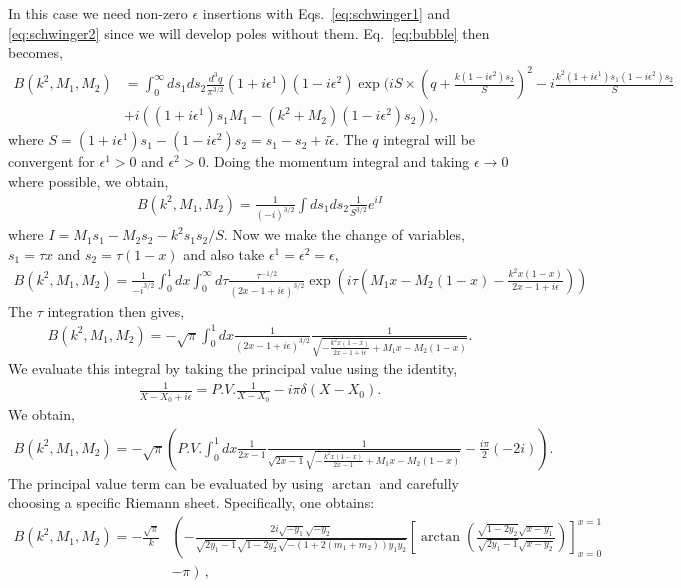 \documentclass[twoside]{article}
\begin{document}
In this case we need non-zero $\epsilon$ insertions with Eqs.~\eqref{eq:schwinger1} and \eqref{eq:schwinger2} since we will develop poles without them. Eq.~\eqref{eq:bubble} then becomes,
\begin{align}
 B(k^2, M_1, M_2) &= \int_0^\infty ds_1 ds_2\frac{d^3q}{\pi^{3/2}}(1 + i\epsilon^1)(1 - i\epsilon^2)\exp\Big( i S \times \left( q + \frac{k(1 - i\epsilon^2)s_2}{S} \right)^2 - i\frac{k^2(1+i\epsilon^1) s_1 (1-i\epsilon^2) s_2}{S} \nonumber \\
&+ i\left( (1 + i\epsilon^1)s_1 M_1 - (k^2 + M_2)(1 - i\epsilon^2)s_2 \right) \Big),
\end{align}
where $S = (1 + i\epsilon^1)s_1 - (1-i\epsilon^2)s_2 = s_1 - s_2 + i \tilde{\epsilon}$. The $q$ integral will be convergent for $\epsilon^1 > 0$ and $\epsilon^2 > 0$. Doing the momentum integral and taking $\epsilon \rightarrow 0$ where possible, we obtain,
\begin{align}
  B(k^2, M_1,M_2) = \frac{1}{(-i)^{3/2}}\int ds_1ds_2\frac{1}{S^{3/2}}e^{iI}
\end{align}
where $I = M_1 s_1 - M_2 s_2 - k^2 s_1s_2/S$. Now we make the
change of variables, $s_1 = \tau x$ and $s_2 = \tau(1-x)$ and also take $\epsilon^1 = \epsilon^2 = \epsilon$,
\begin{align}
  B(k^2,M_1,M_2) = \frac{1}{-i^{3/2}}\int^1_0dx\int^{\infty}_0d\tau \frac{\tau^{-1/2}}{(2x-1 + i\epsilon)^{3/2}}\exp\left( i\tau\left(
      M_1 x - M_2(1-x) - \frac{k^2x(1-x)}{2x-1 + i\epsilon}
  \right)\right)
\end{align}
The $\tau$ integration then gives,
\begin{align}
 B(k^2,M_1,M_2) =   -\sqrt{\pi}\int^1_0dx \frac{1}{(2x - 1 + i\epsilon)^{3/2}}\frac{1}{\sqrt{-\frac{k^2x(1-x)}{2x-1+ i\epsilon} + M_1x - M_2(1-x)}}.
\end{align}
We evaluate this integral by taking the principal value using the identity,
\begin{align}
  \frac{1}{X - X_0+ i\epsilon} = P.V.\frac{1}{X-X_0} - i\pi \delta  (X- X_0) .
\end{align}
We obtain,
\begin{align}
\label{eq:PVintegral}
 B(k^2,M_1,M_2) = -\sqrt{\pi}\left(P.V. \int^1_0dx \frac{1}{2x - 1}\frac{1}{\sqrt{2x - 1}\sqrt{-\frac{k^2x(1-x)}{2x-1} + M_1x - M_2(1-x)}} -\frac{i \pi}{2} (-2 i) \right).
\end{align}
The principal value term can be evaluated by using $\arctan$ and carefully choosing a specific Riemann sheet.
Specifically, one obtains:
\begin{equation}
\begin{split}
B(k^2, M_1, M_2) = -\frac{\sqrt{\pi}}{k}&\left(-\frac{2 i \sqrt{- y_1} \sqrt{- y_2}}{\sqrt{2 y_1-1} \sqrt{1- 2 y_2} \sqrt{-(1 + 2(m_1 + m_2)) y_1 y_2}} \left[ \arctan \left(\frac{\sqrt{1-2 y_2} \sqrt{x -y_1}}{\sqrt{2 y_1-1} \sqrt{x - y_2}}\right)\right]_{x=0}^{x=1}\right. \\
&\left. - \pi \right)\,,
\end{split}
\end{equation}
\end{document}
